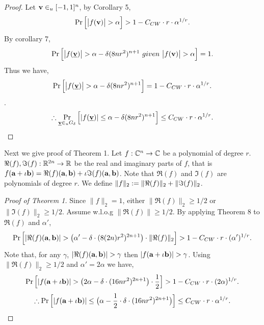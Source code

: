 {\begin{proof}
Let $\textbf v\in_{u} [-1,1]^n$, by Corollary 5, 
$$
\Pr\Big[\big|f(\textbf v)\big| > \alpha\Big] > 1-C_{CW}\cdot r \cdot \alpha^{1/r}.
$$
By corollary 7,
$$
\Pr\Big[\big|f(\textbf{\underline v})\big| > \alpha-\delta(8nr^2)^{n+1}\ given\ \big|f(\textbf v)\big| > \alpha\Big] = 1.
$$
Thus we have,
$$
\Pr\Big[\big|f(\textbf{\underline v})\big| > \alpha-\delta(8nr^2)^{n+1}\Big] = 1-C_{CW}\cdot r \cdot \alpha^{1/r}.
$$.
$$
\therefore \Pr_{\textbf{\underline v} \in_{u} G_{\delta}}\Big[|f(\textbf{\underline v})| \le \alpha-\delta(8nr^2)^{n+1}\Big] \le C_{CW}\cdot r \cdot \alpha^{1/r}.
$$
\end{proof}
Next we give proof of Theorem 1. Let $f:\mathbb{C}^n\to \mathbb{C}$ be a polynomial of degree $r$. $\Re(f),\Im(f):\mathbb{R}^{2n}\to \mathbb{R}$ be the real and imaginary parts of $f$, that is $f(\textbf a + \iota\textbf b) = \Re(f)(\textbf a,\textbf b)+\iota\Im(f)(\textbf a,\textbf b)$. Note that $\Re(f)$ and $\Im(f)$ are polynomials of degree $r$. We define $\|f\|_2 := \|\Re(f)\|_2+\|\Im(f)\|_2$.
\begin{proof}[Proof of Theorem 1]
Since $\|f\|_2 = 1$, either $\|\Re(f)\|_2\ge 1/2$ or $\|\Im(f)\|_2 \ge 1/2$. Assume w.l.o.g $\|\Re(f)\|\ge 1/2$. By applying Theorem 8 to $\Re(f)$ and $\alpha'$, 
$$
\Pr\Big[|\Re(f)(\textbf a, \textbf b)| > \big(\alpha' - \delta \cdot (8(2n)r^2)^{2n+1}\big)\cdot\|\Re(f)\|_2\Big] > 1-C_{CW}\cdot r \cdot (\alpha')^{1/r}.
$$
Note that, for any $\gamma$, $|\Re(f)(\BF a,\BF b)|>\gamma$ then $|f(\BF a + \iota \BF b)|>\gamma$. Using $\|\Re(f)\|_2\ge 1/2$ and $\alpha'=2\alpha$ we have, 
$$
\Pr\Big[|f(\textbf a+\iota\textbf b)| > \big(2\alpha - \delta \cdot (16nr^2)^{2n+1}\big)\cdot \frac{1}{2}\Big] > 1-C_{CW}\cdot r \cdot (2\alpha)^{1/r}.
$$
$$
\therefore\Pr\Big[|f(\textbf a+\iota\textbf b)| \le \big(\alpha - \frac{1}{2}\cdot  \delta \cdot(16nr^2)^{2n+1}\big)\Big] \le C_{CW}\cdot r \cdot \alpha^{1/r}.
$$

\end{proof}
}
